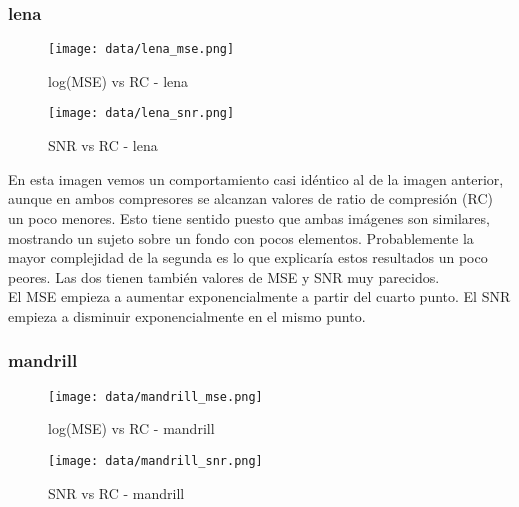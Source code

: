 \documentclass[12pt,a4paper]{article}
\begin{document}
\subsubsection{lena}
\hspace*{-2.5em}
\begin{minipage}{0.5\textwidth}
        \centering
        \begin{figure}[H]
    \centering
    \texttt{[image: data/lena\_mse.png]}
    \caption{log(MSE) vs RC - lena}
    
\end{figure}
\end{minipage}\hfill
    \begin{minipage}{0.5\textwidth}
        \centering
        \begin{figure}[H]
    \centering
    \texttt{[image: data/lena\_snr.png]}
    \caption{SNR vs RC - lena}
    
\end{figure}
\end{minipage}
\vspace{2em}

En esta imagen vemos un comportamiento casi idéntico al de la imagen anterior, aunque en ambos compresores se alcanzan valores de ratio de compresión (RC) un poco menores. Esto tiene sentido puesto que ambas imágenes son similares, mostrando un sujeto sobre un fondo con pocos elementos. Probablemente la mayor complejidad de la segunda es lo que explicaría estos resultados un poco peores. Las dos tienen también valores de MSE y SNR muy parecidos.\\

El  MSE empieza a aumentar exponencialmente a partir del cuarto punto. El SNR empieza a disminuir exponencialmente en el mismo punto.
 
\subsubsection{mandrill}
\hspace*{-2.5em}
\begin{minipage}{0.5\textwidth}
        \centering
        \begin{figure}[H]
    \centering
    \texttt{[image: data/mandrill\_mse.png]}
    \caption{log(MSE) vs RC - mandrill }
    
\end{figure}
\end{minipage}\hfill
    \begin{minipage}{0.5\textwidth}
        \centering
        \begin{figure}[H]
    \centering
    \texttt{[image: data/mandrill\_snr.png]}
    \caption{SNR vs RC - mandrill}
    
\end{figure}
\end{minipage}
\vspace{2em}
\end{document}
